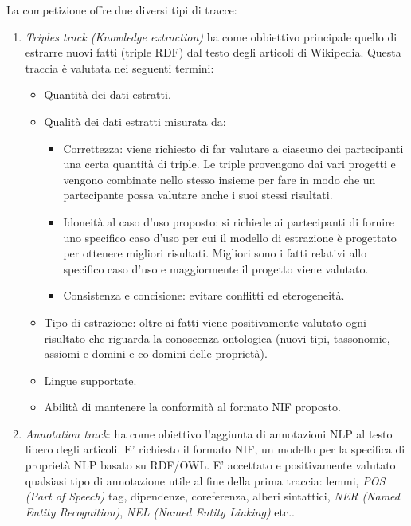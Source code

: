 La competizione offre due diversi tipi di tracce:
\begin{enumerate}
\item \textit{Triples track (Knowledge extraction)} ha come obbiettivo principale quello di estrarre nuovi fatti (triple RDF) dal testo degli articoli di Wikipedia. Questa traccia è valutata nei seguenti termini:
  \begin{itemize}
  \item Quantità dei dati estratti.
  \item Qualità dei dati estratti misurata da:
    \begin{itemize}
    
    \item Correttezza: viene richiesto di far valutare a ciascuno dei partecipanti una certa quantità di triple. Le triple provengono dai vari progetti e vengono combinate nello stesso insieme per fare in modo che un partecipante possa valutare anche i suoi stessi risultati.
    
    \item Idoneità al caso d'uso proposto: si richiede ai partecipanti di fornire uno specifico caso d'uso per cui il modello di estrazione è progettato per ottenere migliori risultati. Migliori sono i fatti relativi allo specifico caso d'uso e maggiormente il progetto viene valutato.
    
    \item Consistenza e concisione: evitare conflitti ed eterogeneità.
    \end{itemize}
	
    \item Tipo di estrazione: oltre ai fatti viene positivamente valutato ogni risultato che riguarda la conoscenza ontologica (nuovi tipi, tassonomie, assiomi e domini e co-domini delle proprietà).
  
  	\item Lingue supportate.
  
  	\item Abilità di mantenere la conformità al formato NIF proposto.

	
  \end{itemize}
  
\item \textit{Annotation track}: ha come obiettivo l'aggiunta di annotazioni NLP al testo libero degli articoli. E' richiesto il formato NIF, un modello per la specifica di proprietà NLP basato su RDF/OWL. E' accettato e positivamente valutato qualsiasi tipo di annotazione utile al fine della prima traccia: lemmi, \textit{POS (Part of Speech)} tag, dipendenze, coreferenza, alberi sintattici, \textit{NER (Named Entity Recognition)}, \textit{NEL (Named Entity Linking)} etc..
\end{enumerate}


